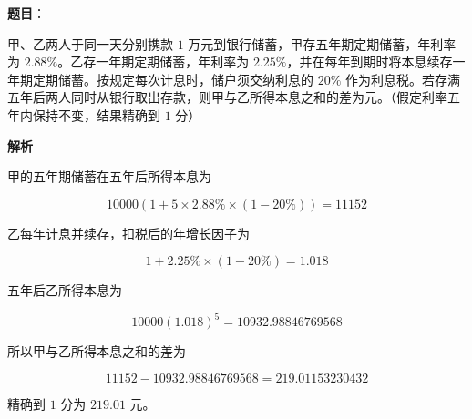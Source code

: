 \begin{answer}

\textbf{题目}：

甲、乙两人于同一天分别携款 $1$ 万元到银行储蓄，甲存五年期定期储蓄，年利率为 $2.88\%$。乙存一年期定期储蓄，年利率为 $2.25\%$，并在每年到期时将本息续存一年期定期储蓄。按规定每次计息时，储户须交纳利息的 $20\%$ 作为利息税。若存满五年后两人同时从银行取出存款，则甲与乙所得本息之和的差为\gkblank{}元。（假定利率五年内保持不变，结果精确到 $1$ 分）

\textbf{解析}

甲的五年期储蓄在五年后所得本息为

\nopagebreak[4]
\[
10000\left(1+5\times2.88\%\times(1-20\%)\right)
=11152
\]

乙每年计息并续存，扣税后的年增长因子为

\nopagebreak[4]
\[
1+2.25\%\times(1-20\%)=1.018
\]

五年后乙所得本息为

\nopagebreak[4]
\[
10000(1.018)^5=10932.98846769568
\]

所以甲与乙所得本息之和的差为

\nopagebreak[4]
\[
11152-10932.98846769568=219.01153230432
\]

精确到 $1$ 分为 $219.01$ 元。


\end{answer}

